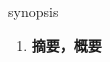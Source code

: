 
\begin{frame}
{\huge synopsis}
\begin{center}
\begin{enumerate}\Large
  \item \textbf{摘要，概要}
\end{enumerate}
\end{center}
\end{frame}
